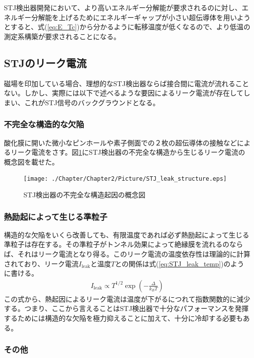 		STJ検出器開発において、より高いエネルギー分解能が要求されるのに対し、エネルギー分解能を上げるためにエネルギーギャップが小さい超伝導体を用いようとすると、式(\ref{eq:E_Tc})から分かるように転移温度が低くなるので、より低温の測定系構築が要求されることになる。
		
	\subsection{STJのリーク電流}
		磁場を印加している場合、理想的なSTJ検出器ならば接合間に電流が流れることない。しかし、実際には以下で述べるような要因によるリーク電流が存在してしまい、これがSTJ信号のバックグラウンドとなる。
		\subsubsection{不完全な構造的な欠陥}
			酸化膜に開いた微小なピンホールや素子側面での２枚の超伝導体の接触などによるリーク電流をさす。図\ref{fig:STJ_leak_structure}にSTJ検出器の不完全な構造から生じるリーク電流の概念図を載せた。
			\begin{figure}[htbp]
  				\begin{center}
    					\texttt{[image: ./Chapter/Chapter2/Picture/STJ\_leak\_structure.eps]}
    					\caption{STJ検出器の不完全な構造起因の概念図}
    					\label{fig:STJ_leak_structure}
  				\end{center}
			\end{figure}	
		
		\subsubsection{熱励起によって生じる準粒子}
		構造的な欠陥をいくら改善しても、有限温度であれば必ず熱励起によって生じる準粒子は存在する。その準粒子がトンネル効果によって絶縁膜を流れるのならば、それはリーク電流となり得る。このリーク電流の温度依存性は理論的に計算されており、リーク電流$I_{\mathrm{leak}}$と温度$T$との関係は式(\ref{eq:STJ_leak_temp})のように書ける。\cite{13}
		\begin{eqnarray}
			I_{\mathrm{leak}} \propto T^{1/2} \exp \left(- \frac{\Delta}{k_{B}T} \right)
			\label{eq:STJ_leak_temp}
		\end{eqnarray}
		この式から、熱起因によるリーク電流は温度が下がるにつれて指数関数的に減少する。つまり、ここから言えることはSTJ検出器で十分なパフォーマンスを発揮するためには構造的な欠陥を極力抑えることに加えて、十分に冷却する必要もある。
		
		\subsubsection{その他}	
	
